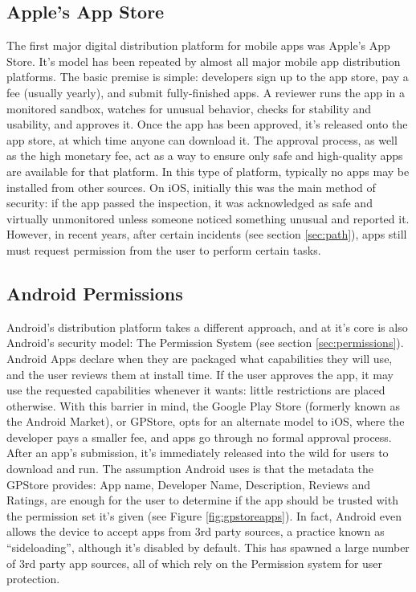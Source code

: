 \subsection{Apple's App Store}
The first major digital distribution platform for mobile apps was Apple's App Store\citep{AppleAppStore}. It's model has been repeated by almost all major mobile app distribution platforms. The basic premise is simple: developers sign up to the app store, pay a fee (usually yearly), and submit fully-finished apps. A reviewer runs the app in a monitored sandbox, watches for unusual behavior, checks for stability and usability, and approves it. Once the app has been approved, it's released onto the app store, at which time anyone can download it. The approval process, as well as the high monetary fee, act as a way to ensure only safe and high-quality apps are available for that platform. In this type of platform, typically no apps may be installed from other sources. On iOS, initially this was the main method of security: if the app passed the inspection, it was acknowledged as safe and virtually unmonitored unless someone noticed something unusual and reported it. However, in recent years, after certain incidents (see section \ref{sec:path}), apps still must request permission from the user to perform certain tasks.

\subsection{Android Permissions}
Android's distribution platform takes a different approach, and at it's core is also Android's security model: The Permission System (see section \ref{sec:permissions}). Android Apps declare when they are packaged what capabilities they will use, and the user reviews them at install time. If the user approves the app, it may use the requested capabilities whenever it wants: little restrictions are placed otherwise. With this barrier in mind, the Google Play Store (formerly known as the Android Market), or GPStore, opts for an alternate model to iOS, where the developer pays a smaller fee, and apps go through no formal approval process. After an app's submission, it's immediately released into the wild for users to download and run. The assumption Android uses is that the metadata the GPStore provides: App name, Developer Name, Description, Reviews and Ratings, are enough for the user to determine if the app should be trusted with the permission set it's given (see Figure \ref{fig:gpstoreapps}). In fact, Android even allows the device to accept apps from 3rd party sources, a practice known as ``sideloading'', although it's disabled by default. This has spawned a large number of 3rd party app sources, all of which rely on the Permission system for user protection.

